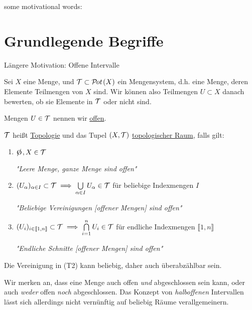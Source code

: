 some motivational words:

\section{Grundlegende Begriffe}

Längere Motivation: Offene Intervalle

\begin{definition}[Topologie]
    Sei $X$ eine Menge, und $\mathcal{T} \subset \mathcal{P}\hspace{-1pt}ot\hspace{1pt}(X)$ ein Mengensystem, d.h. eine Menge, deren Elemente Teilmengen von $X$ sind. Wir können also Teilmengen $U \subset X$ danach bewerten, ob sie Elemente in $\mathcal{T}$ oder nicht sind.

    Mengen $U \in \mathcal{T}$ nennen wir \underline{offen}.
    
    $\mathcal{T}$ heißt \underline{Topologie} und das Tupel $(X, \mathcal{T})$ \underline{topologischer Raum}, falls gilt:
    \begin{enumerate}[label=(T\arabic*)]
        \item $\e, X \in \T$

        \emph{"Leere Menge, ganze Menge sind offen"}
        \item $(U_{\alpha})_{\alpha \in I} \subset \mathcal{T} \implies \bigcup\limits_{\alpha \in I} U_{\alpha} \in \mathcal{T}$ für beliebige Indexmengen $I$

        \emph{"Beliebige Vereinigungen [offener Mengen] sind offen"}
        \item $(U_i)_{i \in \llbracket 1, n \rrbracket} \subset \mathcal{T} \implies \bigcap\limits_{i = 1}\limits^n U_i \in \mathcal{T}$ für endliche Indexmengen $\llbracket 1, n \rrbracket$

        \emph{"Endliche Schnitte [offener Mengen] sind offen"}
    \end{enumerate}
\end{definition}

Die Vereinigung in (T2) kann beliebig, daher auch überabzählbar sein.

Wir merken an, dass eine Menge auch offen \emph{und} abgeschlossen sein kann, oder auch \emph{weder} offen \emph{noch} abgeschlossen. Das Konzept von \emph{halboffenen} Intervallen lässt sich allerdings nicht vernünftig auf beliebig Räume verallgemeinern.

